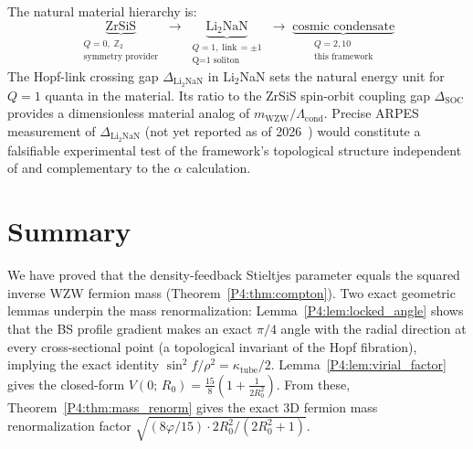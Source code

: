 \documentclass[11pt,a4paper]{article}
\theoremstyle{definition}
\theoremstyle{remark}
\newcommand{\vp}{\varphi}
\newcommand{\Lcond}{\Lambda_{\mathrm{cond}}}
\newcommand{\mWZW}{m_{\mathrm{WZW}}}
\begin{document}
\begin{enumerate}[noitemsep]
The natural material hierarchy is:
\begin{equation*}
  \underbrace{\mathrm{ZrSiS}}_{\substack{Q=0,\;\mathbb{Z}_2\\\text{symmetry provider}}}
  \;\longrightarrow\;
  \underbrace{\mathrm{Li_2NaN}}_{\substack{Q=1,\;\text{link}\,{=}\pm1\\\text{Q=1 soliton}}}
  \;\longrightarrow\;
  \underbrace{\text{cosmic condensate}}_{\substack{Q=2,10\\\text{this framework}}}
\end{equation*}
The Hopf-link crossing gap $\Delta_{\mathrm{Li_2NaN}}$ in Li$_2$NaN sets the
natural energy unit for $Q=1$ quanta in the material.  Its ratio to the ZrSiS
spin-orbit coupling gap $\Delta_\mathrm{SOC}$ provides a dimensionless material
analog of $\mWZW/\Lcond$.  Precise ARPES measurement of $\Delta_{\mathrm{Li_2NaN}}$
(not yet reported as of 2026~\cite{Neupane2016,Lodge2024}) would constitute a
falsifiable experimental test of the framework's topological structure independent
of and complementary to the $\alpha$ calculation.

\end{enumerate}

\section{Summary}
\label{P4:sec:summary}

We have proved that the density-feedback Stieltjes parameter equals
the squared inverse WZW fermion mass (Theorem~\ref{P4:thm:compton}).
Two exact geometric lemmas underpin the mass renormalization:
Lemma~\ref{P4:lem:locked_angle} shows that the BS profile gradient makes
an exact $\pi/4$ angle with the radial direction at every cross-sectional
point (a topological invariant of the Hopf fibration), implying the
exact identity $\sin^2\!f/\rho^2 = \kappa_\mathrm{tube}/2$.
Lemma~\ref{P4:lem:virial_factor} gives the closed-form
$V(0;\,R_0) = \tfrac{15}{8}(1+\tfrac{1}{2R_0^2})$.
From these, Theorem~\ref{P4:thm:mass_renorm} gives the exact 3D fermion mass
renormalization factor $\sqrt{(8\vp/15)\cdot 2R_0^2/(2R_0^2+1)}$.
\end{document}
